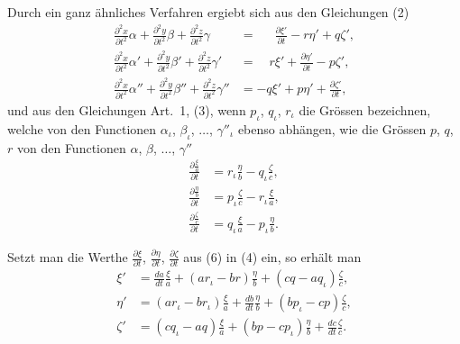 \documentclass[12pt,a4paper]{book}
\theoremstyle{definition}
\theoremstyle{remark}
\begin{document}
Durch ein ganz ähnliches Verfahren ergiebt sich aus den Gleichungen (2)
\begin{equation}
\tag{5}
\begin{aligned}
\frac{\partial^2 x}{\partial t^2}\alpha + \frac{\partial^2 y}{\partial t^2}\beta + \frac{\partial^2 z}{\partial t^2}\gamma &= \quad\ \ \frac{\partial \xi'}{\partial t} - r\eta' + q\zeta',\\
\frac{\partial^2 x}{\partial t^2}\alpha' + \frac{\partial^2 y}{\partial t^2}\beta' + \frac{\partial^2 z}{\partial t^2}\gamma' &= \quad r\xi' + \frac{\partial \eta'}{\partial t} - p\zeta',\\
\frac{\partial^2 x}{\partial t^2}\alpha'' + \frac{\partial^2 y}{\partial t^2}\beta'' + \frac{\partial^2 z}{\partial t^2}\gamma'' &= -q\xi' + p\eta' + \frac{\partial \zeta'}{\partial t},
\end{aligned}
\end{equation}
und aus den Gleichungen Art.~1, (3), wenn $p_\iota$, $q_\iota$, $r_\iota$ die Grössen bezeichnen, welche von den Functionen $\alpha_\iota$, $\beta_\iota$, $\ldots$, $\gamma''_{\iota}$ ebenso abhängen, wie die Grössen $p$, $q$, $r$ von den Functionen $\alpha$, $\beta$, $\ldots$, $\gamma''$
\begin{equation}
\tag{6}
\begin{aligned}
\frac{\partial \frac{\xi}{a}}{\partial t} &= r_\iota\frac{\eta}{b} - q_\iota\frac{\zeta}{c},\\
\frac{\partial \frac{\eta}{b}}{\partial t} &= p_\iota\frac{\zeta}{c} - r_\iota\frac{\xi}{a},\\
\frac{\partial \frac{\zeta}{c}}{\partial t} &= q_\iota\frac{\xi}{a} - p_\iota\frac{\eta}{b}.
\end{aligned}
\end{equation}

Setzt man die Werthe $\frac{\partial \xi}{\partial t}$, $\frac{\partial \eta}{\partial t}$, $\frac{\partial \zeta}{\partial t}$ aus (6) in (4) ein, so erhält man
\begin{equation}
\tag{7}
\begin{aligned}
\xi' &= \frac{da}{dt}\frac{\xi}{a} + (ar_\iota - br)\frac{\eta}{b} + (cq - aq_\iota)\frac{\zeta}{c},\\
\eta' &= (ar_\iota - br_\iota)\frac{\xi}{a} + \frac{db}{dt}\frac{\eta}{b} + (bp_\iota - cp)\frac{\zeta}{c},\\
\zeta' &= (cq_\iota - aq)\frac{\xi}{a} + (bp - cp_\iota)\frac{\eta}{b} + \frac{dc}{dt}\frac{\zeta}{c}.
\end{aligned}
\end{equation}
\end{document}
